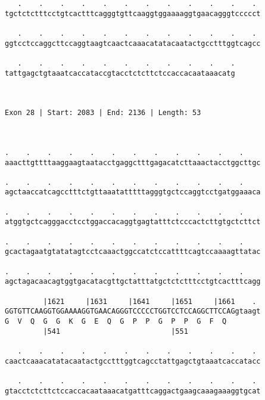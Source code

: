 \documentclass{article}
\begin{document}
\begin{Verbatim}
   .    .    .    .    .    .    .    .    .    .    .    . 
tgctctctttcctgtcactttcagggtgttcaaggtggaaaaggtgaacagggtccccct
                                                            
   .    .    .    .    .    .    .    .    .    .    .    . 
ggtcctccaggcttccaggtaagtcaactcaaacatatacaatactgcctttggtcagcc
                                                            
   .    .    .    .    .    .    .    .    .    .    .
tattgagctgtaaatcaccataccgtacctctcttctccaccacaataaacatg
                                                      
                                                      
 
Exon 28 | Start: 2083 | End: 2136 | Length: 53



.    .    .    .    .    .    .    .    .    .    .    .    
aaacttgttttaaggaagtaatacctgaggctttgagacatcttaaactacctggcttgc
                                                            
.    .    .    .    .    .    .    .    .    .    .    .    
agctaaccatcagcctttctgttaaatatttttagggtgctccaggtcctgatggaaaca
                                                            
.    .    .    .    .    .    .    .    .    .    .    .    
atggtgctcagggacctcctggaccacaggtgagtatttctcccactcttgtgctcttct
                                                            
.    .    .    .    .    .    .    .    .    .    .    .    
gcactagaatgtatatagtcctcaaactggccatctccattttcagtccaaaagttatac
                                                            
.    .    .    .    .    .    .    .    .    .    .    .    
agctagacaacagtggtgacatacgttgctatttatgctctctttcctgtcactttcagg
                                                            
         |1621     |1631     |1641     |1651     |1661    . 
GGTGTTCAAGGTGGAAAAGGTGAACAGGGTCCCCCTGGTCCTCCAGGCTTCCAGgtaagt
G  V  Q  G  G  K  G  E  Q  G  P  P  G  P  P  G  F  Q        
         |541                          |551                 
  
   .    .    .    .    .    .    .    .    .    .    .    . 
caactcaaacatatacaatactgcctttggtcagcctattgagctgtaaatcaccatacc
                                                            
   .    .    .    .    .    .    .    .    .    .    .    . 
gtacctctcttctccaccacaataaacatgatttcaggactgaagcaaagaaaggtgcat
                                                            

\end{Verbatim}
\end{document}
